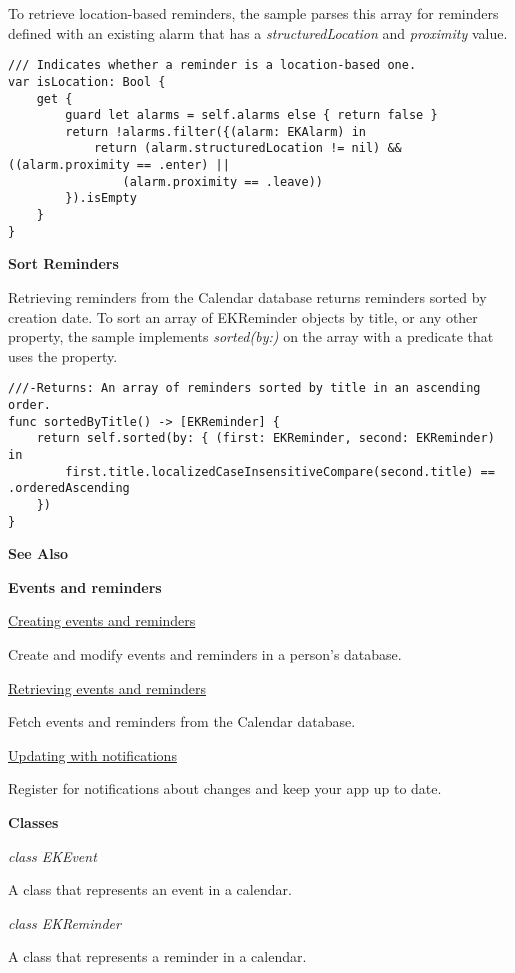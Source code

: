 \documentclass{article}
\begin{document}
To retrieve location-based reminders, the sample parses this array for reminders defined with an existing alarm that has a \textit{structuredLocation} and \textit{proximity} value.

\begin{verbatim}
/// Indicates whether a reminder is a location-based one.
var isLocation: Bool {
    get {
        guard let alarms = self.alarms else { return false }
        return !alarms.filter({(alarm: EKAlarm) in
            return (alarm.structuredLocation != nil) && ((alarm.proximity == .enter) ||
                (alarm.proximity == .leave))
        }).isEmpty
    }
}
\end{verbatim}

\textbf{Sort Reminders}

Retrieving reminders from the Calendar database returns reminders sorted by creation date. To sort an array of EKReminder objects by title, or any other property, the sample implements \textit{sorted(by:)} on the array with a predicate that uses the property.

\begin{verbatim}
///-Returns: An array of reminders sorted by title in an ascending order.
func sortedByTitle() -> [EKReminder] {
    return self.sorted(by: { (first: EKReminder, second: EKReminder) in
        first.title.localizedCaseInsensitiveCompare(second.title) == .orderedAscending
    })
}
\end{verbatim}

\textbf{See Also}

\textbf{Events and reminders}

\href{https://example.com}{Creating events and reminders}

Create and modify events and reminders in a person's database.

\href{https://example.com}{Retrieving events and reminders}

Fetch events and reminders from the Calendar database.

\href{https://example.com}{Updating with notifications}

Register for notifications about changes and keep your app up to date.

\textbf{Classes}

\textit{class EKEvent}

A class that represents an event in a calendar.

\textit{class EKReminder}

A class that represents a reminder in a calendar.
\newpage
\end{document}

